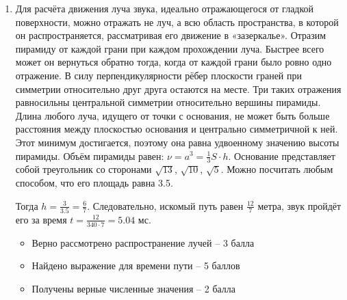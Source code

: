 \begin{enumerate}
    \item Для расчёта движения луча звука, идеально отражающегося от гладкой поверхности, можно отражать не луч, а всю область пространства, в которой он распространяется, рассматривая его движение в «зазеркалье». Отразим пирамиду от каждой грани при каждом прохождении луча. Быстрее всего может он вернуться обратно тогда, когда от каждой грани было ровно одно отражение. В силу перпендикулярности рёбер плоскости граней при симметрии относительно друг друга остаются на месте. Три таких отражения равносильны центральной симметрии относительно вершины пирамиды. Длина любого луча, идущего от точки с основания, не может быть больше расстояния между плоскостью основания и центрально симметричной к ней.  Этот минимум достигается, поэтому она равна удвоенному значению высоты пирамиды. Объём пирамиды равен: $\nu =a^3=\frac{1}{3} S\cdot h$.  Основание представляет собой треугольник со сторонами $\sqrt{13}$, $\sqrt{10}$, $\sqrt{5}$. Можно посчитать любым способом, что его площадь равна 3.5. 
    
    Тогда $h = \frac{3}{3.5} = \frac{6}{7}$. Следовательно, искомый путь равен $\frac{12}{7}$ метра, звук пройдёт его за время $t = \frac{12}{340 \cdot 7} = 5.04$ мс.


    \markSection

    \begin{itemize}
        \item Верно рассмотрено распространение лучей – 3 балла
	    \item Найдено выражение для времени пути – 5 баллов
	    \item Получены верные численные значения – 2 балла
    \end{itemize}
\end{enumerate}
